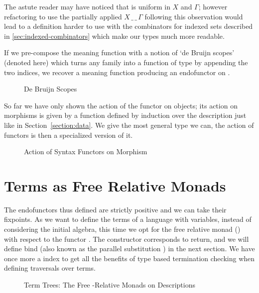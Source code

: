 The astute reader may have noticed that  is uniform in $X$ and $\Gamma$; however
refactoring  to use the partially applied $X\,\_\,\_\,\Gamma$ following
this observation would lead to a definition harder to use with the
combinators for indexed sets described in \cref{sec:indexed-combinators}
which make our types much more readable.

If we pre-compose the meaning function  with a notion of `de Bruijn scopes'
(denoted  here) which turns any   family into a function
of type      by appending the two
 indices, we recover a meaning function producing an endofunctor on
 .

\begin{figure}[h]
\caption{De Bruijn Scopes}\label{figure:debruijnscope}
\end{figure}

So far we have only shown the action of the functor on objects; its action on
morphisms is given by a function  defined by induction over the
description just like in Section~\ref{section:data}. We give  the most
general type we can, the action of functors is then a specialized version of it.

\begin{figure}[h]
\caption{Action of Syntax Functors on Morphism\label{figure:descfmap}}
\end{figure}

\section{Terms as Free Relative Monads}

The endofunctors thus defined are strictly positive and we can take their fixpoints.
As we want to define the terms of a language with variables, instead of
considering the initial algebra, this time we opt for the free relative
monad (\cite{Altenkirch2010, JFR4389}) with respect to the functor .
The  constructor corresponds to return, and we will define bind (also
known as the parallel substitution ) in the next section.
We have once more a  index to get all the benefits of type based
termination checking when defining traversals over terms.

\begin{figure}[h]
\caption{Term Trees: The Free -Relative Monads on Descriptions\label{figure:freemonad}}
\end{figure}

